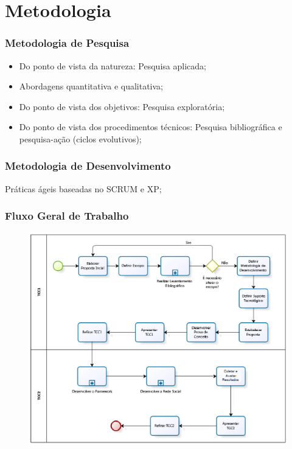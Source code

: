 \documentclass{beamer}
\begin{document}
\section{Metodologia}

\begin{frame}
\frametitle{Metodologia de Pesquisa}

\begin{itemize}
	\item Do ponto de vista da natureza: Pesquisa aplicada;
	\item Abordagens quantitativa e qualitativa;
	\item Do ponto de vista dos objetivos: Pesquisa exploratória;
	\item Do ponto de vista dos procedimentos técnicos: Pesquisa bibliográfica e pesquisa-ação (ciclos evolutivos);
\end{itemize}

\end{frame}

\begin{frame}
\frametitle{Metodologia de Desenvolvimento}

Práticas ágeis baseadas no SCRUM e XP;

\end{frame}

\begin{frame}
\frametitle{Fluxo Geral de Trabalho}

\begin{figure}[h]
	\centering
	\includegraphics[scale=0.45]{../figuras/capitulo4/processo_tcc.eps}
\end{figure}

\end{frame}
\end{document}
